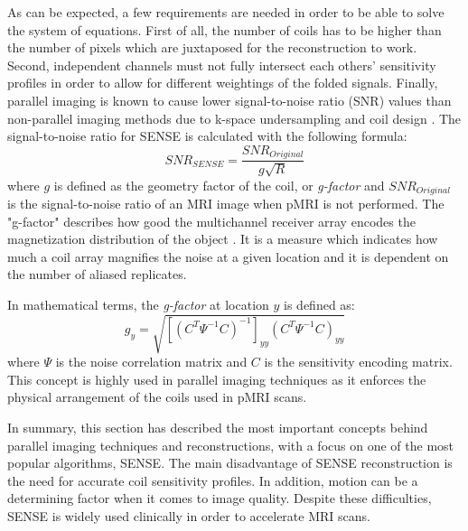 As can be expected, a few requirements are needed in order to be able to solve the system of equations. First of all, the number of coils has to be higher than the number of pixels which are juxtaposed for the reconstruction to work. Second, independent channels must not fully intersect each others' sensitivity profiles in order to allow for different weightings of the folded signals. Finally, parallel imaging is known to cause lower signal-to-noise ratio (SNR) values than non-parallel imaging methods due to k-space undersampling \cite{Aggarwal2003}\cite{Xu2005} and coil design \cite{Weiger2001}\cite{Zhu2004}\cite{Ohliger2003}\cite{Lee2004}. The signal-to-noise ratio for SENSE is calculated with the following formula:
\begin{equation}
    SNR_{SENSE} = \frac{SNR_{Original}}{g \sqrt{R}}
\end{equation}
where $g$ is defined as the geometry factor of the coil, or \textit{g-factor} and $SNR_{Original}$ is the signal-to-noise ratio of an MRI image when pMRI is not performed. The "g-factor" describes how good the multichannel receiver array encodes the magnetization distribution of the object \cite{Omer2010}. It is a measure which indicates how much a coil array magnifies the noise at a given location and it is dependent on the number of aliased replicates.

In mathematical terms, the \textit{g-factor} at location $y$ is defined as:
\begin{equation}
    g_y = \sqrt{ [(C^T \Psi^{-1} C )^{-1}]_{yy} (C^T \Psi^{-1} C )_{yy} }
\end{equation}
where $\Psi$ is the noise correlation matrix and $C$ is the sensitivity encoding matrix. This concept is highly used in parallel imaging techniques as it enforces the physical arrangement of the coils used in pMRI scans.

In summary, this section has described the most important concepts behind parallel imaging techniques and reconstructions, with a focus on one of the most popular algorithms, SENSE. The main disadvantage of SENSE reconstruction is the need for accurate coil sensitivity profiles. In addition, motion can be a determining factor when it comes to image quality. Despite these difficulties, SENSE is widely used clinically in order to accelerate MRI scans.





